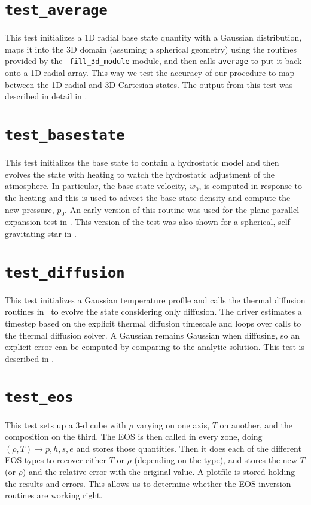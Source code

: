 \section {\tt test\_average} 

  This test initializes a 1D radial base state quantity with a
  Gaussian distribution, maps it into the 3D domain (assuming a
  spherical geometry) using the routines provided by the {\tt
    fill\_3d\_module} module, and then calls {\tt average} to put it
  back onto a 1D radial array.  This way we test the accuracy of our
  procedure to map between the 1D radial and 3D Cartesian states.
  The output from this test was described in detail in
  \cite{multilevel}.


\section {\tt test\_basestate} 

  This test initializes the base state to contain a hydrostatic
  model and then evolves the state with heating to watch the 
  hydrostatic adjustment of the atmosphere.  In particular,
  the base state velocity, $w_0$, is computed in response to 
  the heating and this is used to advect the base state density
  and compute the new pressure, $p_0$.  An early version of 
  this routine was used for the plane-parallel expansion test
  in \cite{lowMach2}.  This version of the test was also shown
  for a spherical, self-gravitating star in \cite{multilevel}.

  
\section {\tt test\_diffusion}

  This test initializes a Gaussian temperature profile and calls
  the thermal diffusion routines in \maestro\ to evolve the state 
  considering only diffusion.  The driver estimates a timestep
  based on the explicit thermal diffusion timescale and loops
  over calls to the thermal diffusion solver.  A Gaussian remains
  Gaussian when diffusing, so an explicit error can be computed
  by comparing to the analytic solution.  This test is 
  described in \cite{xrb}.


\section {\tt test\_eos}

  This test sets up a 3-d cube with $\rho$ varying on one axis, $T$ on
  another, and the composition on the third.  The EOS is then called
  in every zone, doing $(\rho, T) \rightarrow  p, h, s, e$  and stores those
  quantities.  Then it does each of the different EOS types to recover
  either $T$ or $\rho$ (depending on the type), and stores the new $T$ (or
  $\rho$) and the relative error with the original value.  A plotfile is
  stored holding the results and errors.  This allows us to determine
  whether the EOS inversion routines are working right.


